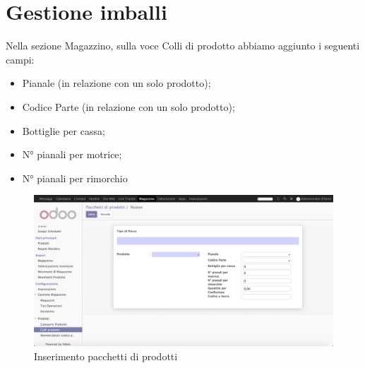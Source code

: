 \section{Gestione imballi}
Nella sezione Magazzino, sulla voce Colli di prodotto abbiamo aggiunto i seguenti campi:
\begin{itemize}
\item Pianale (in relazione con un solo prodotto);
\item Codice Parte (in relazione con un solo prodotto);
\item Bottiglie per cassa;
\item N° pianali per motrice;
\item N° pianali per rimorchio
\end{itemize}

\begin{figure}[H]
	\begin{center} \includegraphics[scale=0.3]{figures/product_packagin}
		\caption[Inserimento pacchetti di prodotti]{Inserimento pacchetti di prodotti}
		\label{fig:product_packagin}
	\end{center}
\end{figure}

